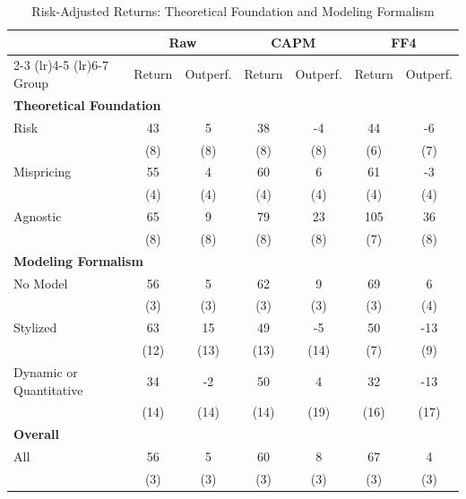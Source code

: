 \begin{table}[htbp]
\centering
\small
\caption{Risk-Adjusted Returns: Theoretical Foundation and Modeling Formalism}
\label{tab:risk_adjusted_tv}
\begin{tabular}{lcccccc}
\toprule
  & \multicolumn{2}{c}{Raw} & \multicolumn{2}{c}{CAPM} & \multicolumn{2}{c}{FF4}
\\
\cmidrule(lr){2-3} \cmidrule(lr){4-5} \cmidrule(lr){6-7}
Group & Return & Outperf. & Return & Outperf. & Return & Outperf.
\\
\midrule
\multicolumn{7}{l}{\textbf{Theoretical Foundation}}\\
\addlinespace[2pt]
Risk & 43 & 5 & 38 & -4 & 44 & -6
\\
 & (8) & (8) & (8) & (8) & (6) & (7)
\\[2pt]
Mispricing & 55 & 4 & 60 & 6 & 61 & -3
\\
 & (4) & (4) & (4) & (4) & (4) & (4)
\\[2pt]
Agnostic & 65 & 9 & 79 & 23 & 105 & 36
\\
 & (8) & (8) & (8) & (8) & (7) & (8)
\\[2pt]
\multicolumn{7}{l}{\textbf{Modeling Formalism}}\\
\addlinespace[2pt]
No Model & 56 & 5 & 62 & 9 & 69 & 6
\\
 & (3) & (3) & (3) & (3) & (3) & (4)
\\[2pt]
Stylized & 63 & 15 & 49 & -5 & 50 & -13
\\
 & (12) & (13) & (13) & (14) & (7) & (9)
\\[2pt]
Dynamic or Quantitative & 34 & -2 & 50 & 4 & 32 & -13
\\
 & (14) & (14) & (14) & (19) & (16) & (17)
\\[2pt]
\multicolumn{7}{l}{\textbf{Overall}}\\
\addlinespace[2pt]
All & 56 & 5 & 60 & 8 & 67 & 4
\\
 & (3) & (3) & (3) & (3) & (3) & (3)
\\[2pt]
\bottomrule
\end{tabular}
\end{table}

